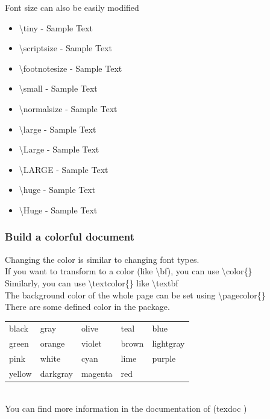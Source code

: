 \documentclass{beamer}
\newcommand{\samplecommand}[1]{\alert{\textbackslash #1}}
\newcommand{\samplecolorbox}[1]{\fcolorbox{black}{#1}{\color{#1}{\tiny{\phantom{0000}}}} \small{#1}}
\newcommand{\sampletext}[2]{\samplecommand{#1} - {#2{Sample Text}}}
\begin{document}
\begin{frame}
	Font size can also be easily modified
	\begin{itemize}
		\item \sampletext{tiny}{\tiny}
		\item \sampletext{scriptsize}{\scriptsize}
		\item \sampletext{footnotesize}{\footnotesize}
		\item \sampletext{small}{\small}
		\item \sampletext{normalsize}{\normalsize}
		\item \sampletext{large}{\large}
		\item \sampletext{Large}{\Large}
		\item \sampletext{LARGE}{\LARGE}
		\item \sampletext{huge}{\huge}
		\item \sampletext{Huge}{\Huge}
	\end{itemize}
\end{frame}

\begin{frame}
	\frametitle{Build a colorful document}
	Changing the color is similar to changing font types.\\[0.5em]
	If you want to transform to a color (like \samplecommand{bf}), you can use \samplecommand{color}\{\}\\
	Similarly, you can use \samplecommand{textcolor}\{\} like \samplecommand{textbf}\\
	The background color of the whole page can be set using \samplecommand{pagecolor}\{\}\\[0.5em]
	There are some defined color  in the  package.\\[0.5em]
	\begin{tabular}{lllll}
	\samplecolorbox{black}&\samplecolorbox{gray}&\samplecolorbox{olive}&\samplecolorbox{teal}&\samplecolorbox{blue}\\
	\samplecolorbox{green}&\samplecolorbox{orange}&\samplecolorbox{violet}&\samplecolorbox{brown}&\samplecolorbox{lightgray}\\
	\samplecolorbox{pink}&\samplecolorbox{white}&\samplecolorbox{cyan}&\samplecolorbox{lime}&\samplecolorbox{purple}\\
	\samplecolorbox{yellow}&\samplecolorbox{darkgray}&\samplecolorbox{magenta}&\samplecolorbox{red}\\
	\end{tabular}		
	\\[0.5em]
	You can find more information in the documentation of  (\alert{texdoc} )
\end{frame}
\end{document}
